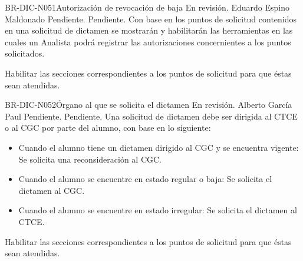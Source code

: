 \begin{BusinessRule}{BR-DIC-N051}{Autorización de revocación de baja}
	{\bcCondition} %
	{\btEnabler}     %
	{\blControlling}     %
	\BRItem[Estado] En revisión.
	  Eduardo Espino Maldonado
	 Pendiente.
	 Pendiente.
	\BRItem[Descripción] Con base en los puntos de solicitud contenidos en una solicitud de dictamen se mostrarán y habilitarán las herramientas en las cuales un Analista podrá registrar las autorizaciones concernientes a los puntos solicitados.
	\BRItem[Sentencia] \cdtEmpty
	
	\BRItem[Motivación] Habilitar las secciones correspondientes a los puntos de solicitud para que éstas sean atendidas.
\end{BusinessRule}

\begin{BusinessRule}{BR-DIC-N052}{Órgano al que se solicita el dictamen}
	{\bcCondition} %
	{\btEnabler}     %
	{\blInfluencing}     %
	\BRItem[Estado] En revisión.
	 Alberto García Paul
	 Pendiente.
	 Pendiente.
	\BRItem[Descripción] Una solicitud de dictamen debe ser dirigida al CTCE o al CGC por parte del alumno, con base en lo siguiente:
	\begin{itemize}
		\item Cuando el alumno tiene un dictamen dirigido al CGC y se encuentra vigente: Se solicita una reconsideración al CGC.
		\item Cuando el alumno se encuentre en estado regular o baja: Se solicita el dictamen al CGC.
		\item Cuando el alumno se encuentre en estado irregular: Se solicita el dictamen al CTCE.
	\end{itemize}
	\BRItem[Sentencia] \cdtEmpty
	
%			
	\BRItem[Motivación] Habilitar las secciones correspondientes a los puntos de solicitud para que éstas sean atendidas.
\end{BusinessRule}

